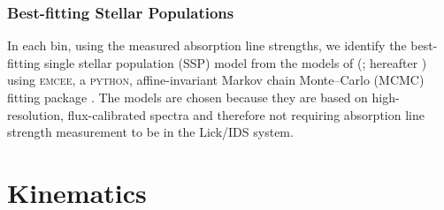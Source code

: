 \documentclass[fleqn,usenatbib,useAMS]{mnras}
\begin{document}
		\subsubsection{Best-fitting Stellar Populations}
			\label{subsubsec:stellarPop}
			In each bin, using the measured absorption line strengths, we identify the best-fitting single stellar population (SSP) model from the models of \citeauthor{Thomas2010} (\citeyear{Thomas2010}; hereafter ) using \textsc{emcee}, a \textsc{python}, affine-invariant Markov chain Monte--Carlo (MCMC) fitting package \citep{Foreman-Mackey2013}. The  models are chosen because they are based on high-resolution, flux-calibrated spectra and therefore not requiring absorption line strength measurement to be in the Lick/IDS system. 

\section{Kinematics}
	\label{sec:kine}


\end{document}
